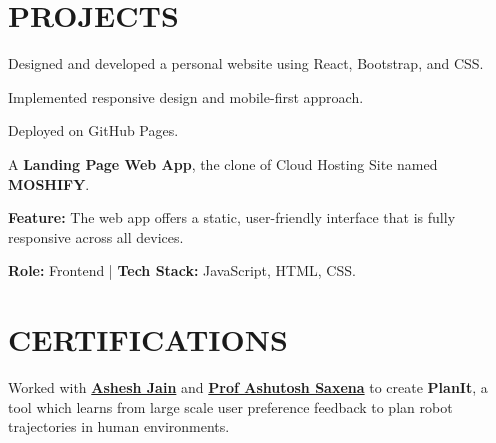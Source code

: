 \documentclass[]{deedy-resume-openfont}
\begin{document}
\begin{minipage}[t]{1.0\textwidth}
\section{PROJECTS}
\vspace{\topsep}
\begin{tightemize}
\item Designed and developed a personal website using React, Bootstrap, and CSS.
\item Implemented responsive design and mobile-first approach.
\item Deployed on GitHub Pages.
\end{tightemize}
\sectionsep

\begin{tightemize}
\item A \textbf{Landing Page Web App}, the clone of Cloud Hosting Site named \textbf{MOSHIFY}.
\item \textbf{Feature:} The web app offers a static, user-friendly interface that is fully responsive across all devices.
\item \textbf{Role:} Frontend | \textbf{Tech Stack:} JavaScript, HTML, CSS.
\end{tightemize}
\sectionsep


\section{CERTIFICATIONS}
Worked with \textbf{\href{http://www.cs.cornell.edu/~ashesh/}{Ashesh Jain}} and \textbf{\href{http://www.cs.cornell.edu/~asaxena/}{Prof Ashutosh Saxena}} to create \textbf{PlanIt}, a tool which  learns from large scale user preference feedback to plan robot trajectories in human environments.  
\sectionsep


\end{minipage}
\end{document}
